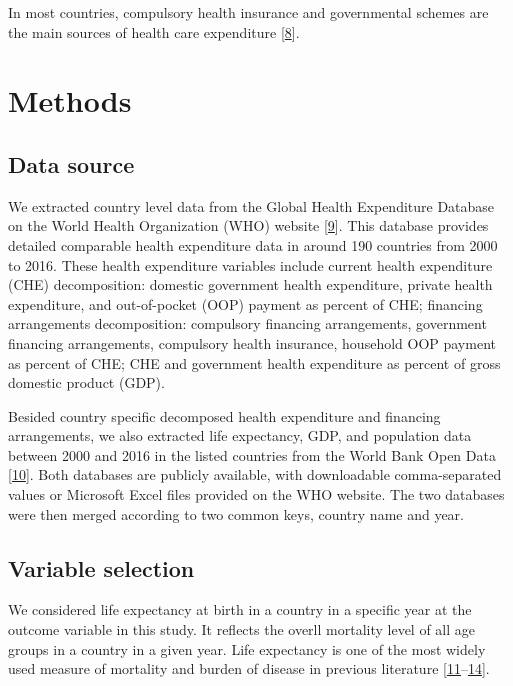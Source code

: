 \documentclass[]{elsarticle} %
\begin{document}
In most countries, compulsory health insurance and governmental schemes are the main sources of health care expenditure {[}\protect\hyperlink{ref-healthglance2017}{8}{]}.

\hypertarget{methods}{%
\section{Methods}\label{methods}}

\hypertarget{data-source}{%
\subsection{Data source}\label{data-source}}

We extracted country level data from the Global Health Expenditure Database on the World Health Organization (WHO) website {[}\protect\hyperlink{ref-WHOdata}{9}{]}.
This database provides detailed comparable health expenditure data in around 190 countries from 2000 to 2016.
These health expenditure variables include current health expenditure (CHE) decomposition: domestic government health expenditure, private health expenditure, and out-of-pocket (OOP) payment as percent of CHE;
financing arrangements decomposition: compulsory financing arrangements, government financing arrangements, compulsory health insurance, household OOP payment as percent of CHE; CHE and government health expenditure as percent of gross domestic product (GDP).

Besided country specific decomposed health expenditure and financing arrangements, we also extracted life expectancy, GDP, and population data between 2000 and 2016 in the listed countries from the World Bank Open Data {[}\protect\hyperlink{ref-worldbank}{10}{]}.
Both databases are publicly available, with downloadable comma-separated values or Microsoft Excel files provided on the WHO website.
The two databases were then merged according to two common keys, country name and year.

\hypertarget{variable-selection}{%
\subsection{Variable selection}\label{variable-selection}}

We considered life expectancy at birth in a country in a specific year at the outcome variable in this study.
It reflects the overll mortality level of all age groups in a country in a given year.
Life expectancy is one of the most widely used measure of mortality and burden of disease in previous literature {[}\protect\hyperlink{ref-lee2012effect}{11}--\protect\hyperlink{ref-mathers2015causes}{14}{]}.
\end{document}
